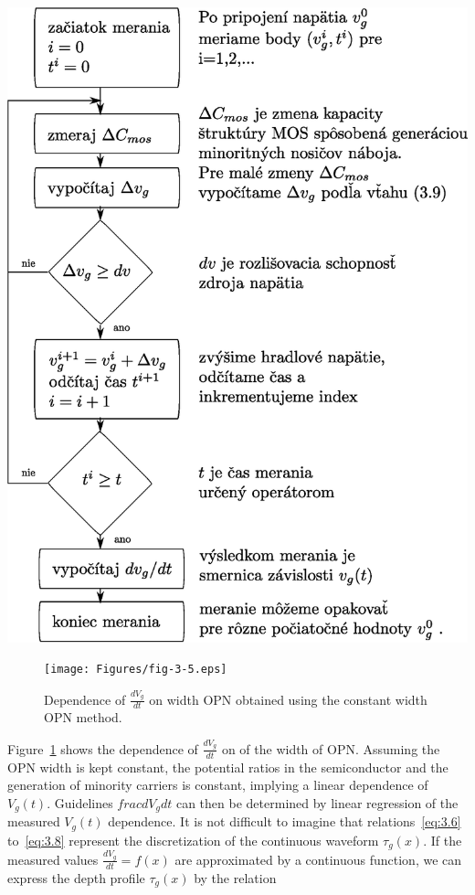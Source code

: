 \begin{diagram}
  \includegraphics[scale=0.55,keepaspectratio]{Figures/diagram-2.EPS}\label{diagram:2}
\end{diagram}

\begin{figure}[h!]\centering
  \texttt{[image: Figures/fig-3-5.eps]}
  \caption[Dependence of $\frac{dV_g}{dt}$ on OPN width obtained by
    constant OPN width method]{Dependence of $\frac{dV_g}{dt}$ on width
    OPN obtained using the constant width OPN method.}\label{fig:3.5}
\end{figure}

Figure~\ref{fig:3.5} shows the dependence of $\frac{dV_g}{dt}$ on
of the width of OPN\@. Assuming the OPN width is kept constant, the
potential ratios in the semiconductor and the generation of minority carriers is
constant, implying a linear dependence of $V_g(t)$.  Guidelines
${frac{dV_g}{dt}}$ can then be determined by linear regression of the measured
$V_g(t)$ dependence. It is not difficult to imagine that
relations~\ref{eq:3.6} to~\ref{eq:3.8} represent the discretization
of the continuous waveform $\tau_g(x)$. If the measured values
$\frac{dV_g}{dt}=f(x)$ are approximated by a continuous function, we can express
the depth profile $\tau_g(x)$ by the relation

